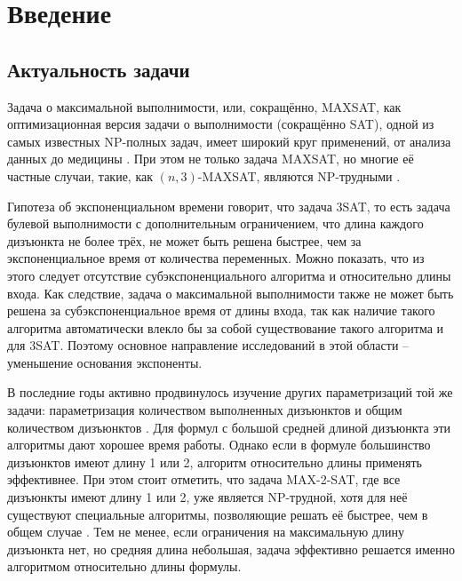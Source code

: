 
\section*{Введение}
\label{sec:intro}

\subsection*{Актуальность задачи}

\firstpar{}Задача о максимальной выполнимости, или, сокращённо, MAXSAT, как оптимизационная версия задачи о выполнимости (сокращённо SAT), одной из самых известных NP-полных задач, имеет широкий круг применений, от анализа данных \cite{berg2015applications} до медицины \cite{lin2012application}.
При этом не только задача MAXSAT, но многие её частные случаи, такие, как $(n,3)$-MAXSAT, являются NP-трудными \cite{raman1998simplified}.

Гипотеза об экспоненциальном времени говорит, что задача 3SAT, то есть задача булевой выполнимости с дополнительным ограничением, что длина каждого дизъюнкта не более трёх, не может быть решена быстрее, чем за экспоненциальное время от количества переменных. Можно показать, что из этого следует отсутствие субэкспоненциального алгоритма и относительно длины входа. Как следствие, задача о максимальной выполнимости также не может быть решена за субэкспоненциальное время от длины входа, так как наличие такого алгоритма автоматически влекло бы за собой существование такого алгоритма и для 3SAT. Поэтому основное направление исследований в этой области -- уменьшение основания экспоненты.

В последние годы активно продвинулось изучение других параметризаций той же задачи: параметризация количеством выполненных дизъюнктов \cite{chen15} и общим количеством дизъюнктов \cite{xu19}. Для формул с большой средней длиной дизъюнкта эти алгоритмы дают хорошее время работы. Однако если в формуле большинство дизъюнктов имеют длину 1 или 2, алгоритм относительно длины применять эффективнее. При этом стоит отметить, что задача MAX-2-SAT, где все дизъюнкты имеют длину 1 или 2, уже является NP-трудной, хотя для неё существуют специальные алгоритмы, позволяющие решать её быстрее, чем в общем случае \cite{golovnev2014new}. Тем не менее, если ограничения на максимальную длину дизъюнкта нет, но средняя длина небольшая, задача эффективно решается именно алгоритмом относительно длины формулы.

